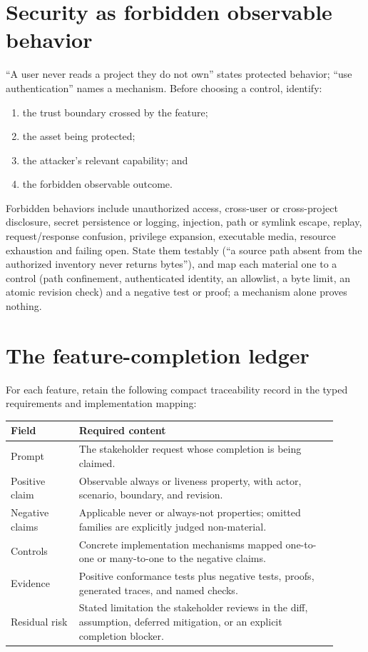 \section{Security as forbidden observable behavior}

``A user never reads a project they do not own'' states protected behavior; ``use
authentication'' names a mechanism. Before choosing a control, identify:

\begin{enumerate}
  \item the trust boundary crossed by the feature;
  \item the asset being protected;
  \item the attacker's relevant capability; and
  \item the forbidden observable outcome.
\end{enumerate}

Forbidden behaviors include unauthorized access, cross-user or cross-project
disclosure, secret persistence or logging, injection, path or symlink escape,
replay, request/response confusion, privilege expansion, executable media, resource
exhaustion and failing open. State them testably (``a source path absent from the
authorized inventory never returns bytes''), and map each material one to a control
(path confinement, authenticated identity, an allowlist, a byte limit, an atomic
revision check) and a negative test or proof; a mechanism alone proves nothing.

\section{The feature-completion ledger}

For each feature, retain the following compact traceability record in the typed
requirements and implementation mapping:

\begin{center}
\begin{tabular}{p{0.19\linewidth}p{0.72\linewidth}}
\toprule
Field & Required content \\
\midrule
Prompt & The stakeholder request whose completion is being claimed. \\
Positive claim & Observable always or liveness property, with actor, scenario,
boundary, and revision. \\
Negative claims & Applicable never or always-not properties; omitted families
are explicitly judged non-material. \\
Controls & Concrete implementation mechanisms mapped one-to-one or
many-to-one to the negative claims. \\
Evidence & Positive conformance tests plus negative tests, proofs, generated
traces, and named checks. \\
Residual risk & Stated limitation the stakeholder reviews in the diff, assumption, deferred mitigation, or an
explicit completion blocker. \\
\bottomrule
\end{tabular}
\end{center}

